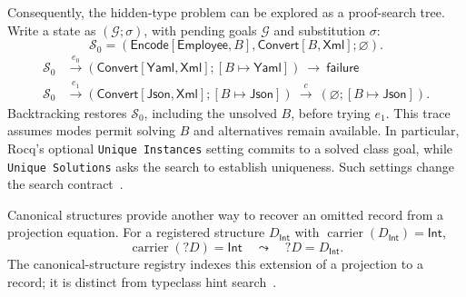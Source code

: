 \documentclass[10pt,a4paper]{article}
\newcommand{\Int}{\mathsf{Int}}
\newcommand{\kw}[1]{\mathsf{#1}}
\begin{document}
Consequently, the hidden-type problem can be explored as a proof-search tree.
Write a state as $(\mathcal G;\sigma)$, with pending goals $\mathcal G$ and
substitution $\sigma$:
\[
 \mathcal S_0=(\kw{Encode}[\kw{Employee},B],\kw{Convert}[B,\kw{Xml}];\varnothing).
\]
\[
\begin{aligned}
 \mathcal S_0&\xrightarrow{e_0}
   (\kw{Convert}[\kw{Yaml},\kw{Xml}];[B\mapsto\kw{Yaml}])
   \ \longrightarrow\ \mathsf{failure}\\
 \mathcal S_0&\xrightarrow{e_1}
   (\kw{Convert}[\kw{Json},\kw{Xml}];[B\mapsto\kw{Json}])
   \ \xrightarrow{c}\ (\varnothing;[B\mapsto\kw{Json}]).
\end{aligned}
\]
Backtracking restores $\mathcal S_0$, including the unsolved $B$, before trying $e_1$.
This trace assumes modes permit solving $B$ and alternatives remain available.
In particular, Rocq's optional \texttt{Unique Instances} setting commits to a
solved class goal, while \texttt{Unique Solutions} asks the search to establish
uniqueness. Such settings change the search contract~\cite{rocq-typeclasses}.

Canonical structures provide another way to recover an omitted record from
a projection equation. For a registered structure $D_{\Int}$ with
$\operatorname{carrier}(D_{\Int})=\Int$,
\[
 \operatorname{carrier}(?D)=\Int
 \quad\leadsto\quad ?D=D_{\Int}.
\]
The canonical-structure registry indexes this extension of a projection to a
record; it is distinct from typeclass hint search~\cite{rocq-canonical}.

\newpage
\end{document}
